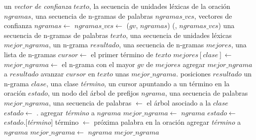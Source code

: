 \begin{algorithm}[t!]
\small
\caption{\small Algoritmo de clasificación a nivel oración.}
\label{alg:t-ss3-classification}
\begin{algorithmic}[1]
\Statex
{} \Returns un \emph{vector de confianza}
	\State \Input $texto$, la secuencia de unidades léxicas de la oración
	\State \LocalVariables $ngramas$, una secuencia de n-gramas de palabras
	\State \localvarsindent $ngramas\_vcs$, vectores de confianza
	\State $ngramas \gets$ 
	\State $ngramas\_vcs \gets$ ($gv$, $ngramas$)
	\State \Return {}(, $ngramas\_vcs$)
\EndFunction
\Statex \hrulefill
{} \Returns una secuencia de n-gramas de palabras
    \State \Input $texto$, una secuencia de unidades léxicas
    \State \LocalVariables $mejor\_ngrama$, un n-grama
    \State \localvarsindent $resultado$, una secuencia de n-gramas
    \State \localvarsindent $mejores$, una lista de n-gramas
    \State $cursor \gets$ el primer término de $texto$
            \State $mejores[clase] \gets$ 
        \EndFor
        \State $mejor\_ngrama \gets$ el n-grama con el mayor $gv$ de $mejores$
        \State agregar $mejor\_ngrama$ a $resultado$
        \State avanzar $cursor$ en $texto$ unas $mejor\_ngrama$. posiciones
    \EndWhile
    \State \Return $resultado$
\EndFunction
\Statex \hrulefill
{} \Returns un n-grama
    \State \Input $clase$, una clase
    \State {} \emph{término}, un cursor apuntando a un término en la oración
    \State \LocalVariables $estado$, un nodo del árbol de prefijos
    \State \localvarsindent $ngrama$, una secuencia de palabras
    \State \localvarsindent $mejor\_ngrama$, una secuencia de palabras
    \State {} $\gets$ el árbol asociado a la $clase$
    \State $estado \gets$ .
    \State agregar \emph{término} a $ngrama$
    \State $mejor\_ngrama \gets$ $ngrama$
        \State $estado \gets$ $estado$.[\emph{término}]
        \State término $\gets$ próxima palabra en la oración
        \State agregar \emph{término} a $ngrama$
            \State $mejor\_ngrama \gets$ $ngrama$
        \EndIf
    \EndWhile
    \State \Return $mejor\_ngrama$
\EndFunction
\end{algorithmic}
\end{algorithm}


